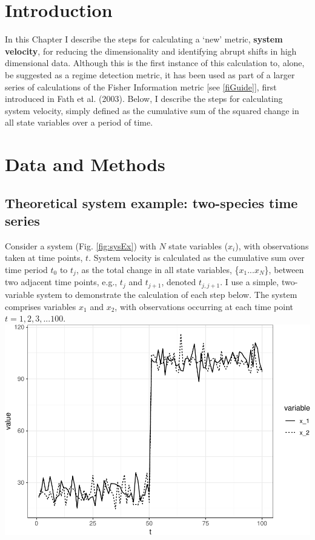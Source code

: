 \documentclass[12pt,twoside,openany]{reedthesis}
\begin{document}
\hypertarget{introduction-3}{%
\section{Introduction}\label{introduction-3}}

In this Chapter I describe the steps for calculating a `new' metric, \textbf{system velocity}, for reducing the dimensionality and identifying abrupt shifts in high dimensional data. Although this is the first instance of this calculation to, alone, be suggested as a regime detection metric, it has been used as part of a larger series of calculations of the Fisher Information metric {[}see \ref{fiGuide}{]}, first introduced in Fath et al. (2003). Below, I describe the steps for calculating system velocity, simply defined as the cumulative sum of the squared change in all state variables over a period of time.

\hypertarget{data-and-methods-1}{%
\section{Data and Methods}\label{data-and-methods-1}}

\hypertarget{theoretical-system-example-two-species-time-series}{%
\subsection{Theoretical system example: two-species time series}\label{theoretical-system-example-two-species-time-series}}

Consider a system (Fig. \ref{fig:sysEx}) with \(N\) state variables (\(x_i\)), with observations taken at time points, \(t\). System velocity is calculated as the cumulative sum over time period \(t_0\) to \(t_j\), as the total change in all state variables, \{\(x_1 ...x_N\)\}, between two adjacent time points, e.g., \(t_j\) and \(t_{j+1}\), denoted \(t_{j,j+1}\). I use a simple, two-variable system to demonstrate the calculation of each step below. The system comprises variables \(x_1\) and \(x_2\), with observations occurring at each time point \(t = {1,2,3,...100}\).
\includegraphics{_myDissertation_files/figure-latex/sysEx-1.pdf}
\end{document}
